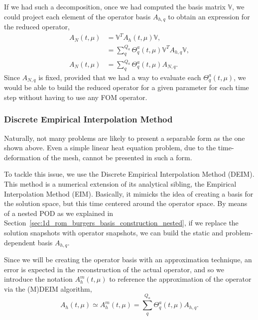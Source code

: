 \documentclass[../../thesis.tex]{subfiles}
\newcommand{\rbV}{\ensuremath{\mathbb{V}}}
\newcommand{\rbVT}{\ensuremath{\rbV^T}}
\begin{document}
If we had such a decomposition, once we had computed the basis matrix \rbV, we could project each element of the operator basis $A_{h, q}$ to obtain an expression for the reduced operator, 
\begin{equation}
    \begin{split}
        A_N(t, \mu) &= \rbVT A_h(t, \mu) \rbV,
        \\ 
        &= \sum_q^{Q_a} \Theta_q^a(t, \mu) \rbVT  A_{h, q} \rbV, 
        \\
        A_N(t, \mu) &= \sum_q^{Q_a} \Theta_q^a(t, \mu) A_{N,q}.
    \end{split}
\end{equation}
Since $A_{N, q}$ is fixed, provided that we had a way to evaluate each $\Theta_q^a(t, \mu)$, we would be able to build the reduced operator for a given parameter for each time step without having to use any FOM operator. 

\subsubsection{Discrete Empirical Interpolation Method}
Naturally, not many problems are likely to present a separable form as the one shown above.
Even a simple linear heat equation problem, due to the time-deformation of the mesh, cannot be presented in such a form. 

To tackle this issue, we use the Discrete Empirical Interpolation Method (DEIM).
This method is a numerical extension of its analytical sibling, the Empirical Interpolation Method (EIM).
Basically, it mimicks the idea of creating a basis for the solution space, but this time centered around the operator space.
By means of a nested POD as we explained in Section~\ref{sec:1d_rom_burgers_basis_construction_nested}, 
if we replace the solution snapshots with operator snapshots, 
we can build the static and problem-dependent basis $A_{h,q}$.

Since we will be creating the operator basis with an approximation technique, 
an error is expected in the reconstruction of the actual operator, 
and so we introduce the notation $A_h^m(t, \mu)$ to reference the approximation of the operator via the (M)DEIM algorithm,
\begin{equation}
    \label{eq:1d_rom_burgers_system_approximation}
    A_h(t, \mu) \simeq A_h^m(t, \mu) = \sum_q^{Q_a} \Theta_q^a(t, \mu) A_{h,q}.
\end{equation}
\end{document}
